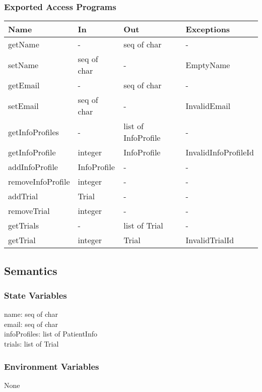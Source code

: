 \documentclass[12pt, titlepage]{article}
\begin{document}
\subsubsection{Exported Access Programs}

\begin{center}
\begin{tabular}{p{4cm} p{4cm} p{4cm} p{4cm}}
\hline
\textbf{Name} & \textbf{In} & \textbf{Out} & \textbf{Exceptions} \\
\hline
getName & - & seq of char & - \\
\hline
setName & seq of char & - & EmptyName \\
\hline
getEmail & - & seq of char & - \\
\hline
setEmail & seq of char & - & InvalidEmail \\
\hline
getInfoProfiles  & - & list of InfoProfile & - \\
\hline
getInfoProfile & integer & InfoProfile & InvalidInfoProfileId \\
\hline
addInfoProfile & InfoProfile & - & - \\
\hline
removeInfoProfile & integer & - & - \\
\hline
addTrial & Trial & - & - \\
\hline
removeTrial & integer & - & - \\
\hline
getTrials & - & list of Trial & - \\
\hline
getTrial & integer & Trial & InvalidTrialId \\
\end{tabular}
\end{center}

\subsection{Semantics}

\subsubsection{State Variables}

name: seq of char\\
email: seq of char\\
infoProfiles: list of PatientInfo\\
trials: list of Trial

\subsubsection{Environment Variables}
None
\end{document}
